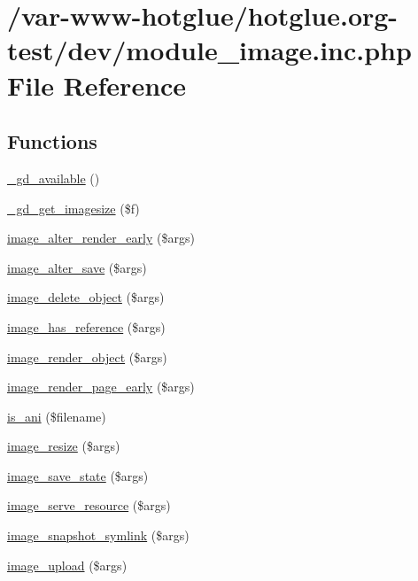 \hypertarget{module__image_8inc_8php}{
\section{/var-\/www-\/hotglue/hotglue.org-\/test/dev/module\_\-image.inc.php File Reference}
\label{module__image_8inc_8php}
}
\subsection*{Functions}
\begin{DoxyCompactItemize}
\item 
\hyperlink{module__image_8inc_8php_a574d6d760e50b88ffa815cab30a5e634}{\_\-gd\_\-available} ()
\item 
\hyperlink{module__image_8inc_8php_a3c76028c34273e722c9691243377a208}{\_\-gd\_\-get\_\-imagesize} (\$f)
\item 
\hyperlink{module__image_8inc_8php_ab52d6b71a5c26dbb7e86653652a23251}{image\_\-alter\_\-render\_\-early} (\$args)
\item 
\hyperlink{module__image_8inc_8php_a93578776fb38b10d47bc711cc3469ae9}{image\_\-alter\_\-save} (\$args)
\item 
\hyperlink{module__image_8inc_8php_a7cbcf6138ccff16a8b733cfd6f0f1666}{image\_\-delete\_\-object} (\$args)
\item 
\hyperlink{module__image_8inc_8php_a0bef6164f5eafe368d251639cf6fe298}{image\_\-has\_\-reference} (\$args)
\item 
\hyperlink{module__image_8inc_8php_a4fadded2a225d1b5ea73404a84597620}{image\_\-render\_\-object} (\$args)
\item 
\hyperlink{module__image_8inc_8php_a8266a74a11a86a73e2aa3709388fd43f}{image\_\-render\_\-page\_\-early} (\$args)
\item 
\hyperlink{module__image_8inc_8php_aba67b6eaafc9c80c5b19a9cda9604830}{is\_\-ani} (\$filename)
\item 
\hyperlink{module__image_8inc_8php_a9e03a71310133176236ae0bd4a0241e0}{image\_\-resize} (\$args)
\item 
\hyperlink{module__image_8inc_8php_ac26ea1448f0b7ed835907cf7c22b60ca}{image\_\-save\_\-state} (\$args)
\item 
\hyperlink{module__image_8inc_8php_abb6646bfaa6a012e620cdaaa0bc3c807}{image\_\-serve\_\-resource} (\$args)
\item 
\hyperlink{module__image_8inc_8php_a65d33fafe2da58d0f87f2df1fedbbe62}{image\_\-snapshot\_\-symlink} (\$args)
\item 
\hyperlink{module__image_8inc_8php_a37dee9de60e2852c0631d8e60e58585c}{image\_\-upload} (\$args)
\end{DoxyCompactItemize}


